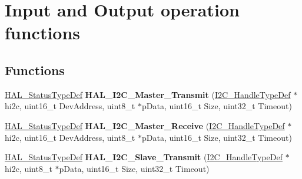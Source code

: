 \hypertarget{group___i2_c___exported___functions___group2}{}\section{Input and Output operation functions}
\label{group___i2_c___exported___functions___group2}
\subsection*{Functions}
\begin{DoxyCompactItemize}
\item 
\mbox{\label{group___i2_c___exported___functions___group2_ga9440a306e25c7bd038cfa8619ec9a830}} 
\hyperlink{stm32f0xx__hal__def_8h_a63c0679d1cb8b8c684fbb0632743478f}{H\+A\+L\+\_\+\+Status\+Type\+Def} {\bfseries H\+A\+L\+\_\+\+I2\+C\+\_\+\+Master\+\_\+\+Transmit} (\hyperlink{struct_____i2_c___handle_type_def}{I2\+C\+\_\+\+Handle\+Type\+Def} $\ast$hi2c, uint16\+\_\+t Dev\+Address, uint8\+\_\+t $\ast$p\+Data, uint16\+\_\+t Size, uint32\+\_\+t Timeout)
\item 
\mbox{\label{group___i2_c___exported___functions___group2_ga6b3cef8c309e88ed6d3b8deba149aac9}} 
\hyperlink{stm32f0xx__hal__def_8h_a63c0679d1cb8b8c684fbb0632743478f}{H\+A\+L\+\_\+\+Status\+Type\+Def} {\bfseries H\+A\+L\+\_\+\+I2\+C\+\_\+\+Master\+\_\+\+Receive} (\hyperlink{struct_____i2_c___handle_type_def}{I2\+C\+\_\+\+Handle\+Type\+Def} $\ast$hi2c, uint16\+\_\+t Dev\+Address, uint8\+\_\+t $\ast$p\+Data, uint16\+\_\+t Size, uint32\+\_\+t Timeout)
\item 
\mbox{\label{group___i2_c___exported___functions___group2_ga9128c5f01406d0da061a2bce00b6866e}} 
\hyperlink{stm32f0xx__hal__def_8h_a63c0679d1cb8b8c684fbb0632743478f}{H\+A\+L\+\_\+\+Status\+Type\+Def} {\bfseries H\+A\+L\+\_\+\+I2\+C\+\_\+\+Slave\+\_\+\+Transmit} (\hyperlink{struct_____i2_c___handle_type_def}{I2\+C\+\_\+\+Handle\+Type\+Def} $\ast$hi2c, uint8\+\_\+t $\ast$p\+Data, uint16\+\_\+t Size, uint32\+\_\+t Timeout)
\item 
\mbox{\label{group___i2_c___exported___functions___group2_ga92b445a5ca4f5b8195f1c10ebdc41687}} 

\end{DoxyCompactItemize}
